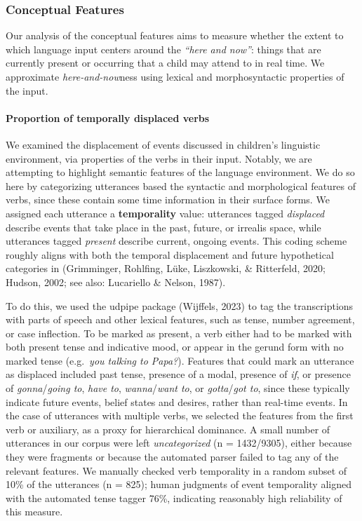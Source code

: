 \documentclass[
  man]{apa6}
\let\oldparagraph\paragraph
\renewcommand{\paragraph}[1]{\oldparagraph{#1}\mbox{}}
\begin{document}
\hypertarget{conceptual-features}{%
\subsubsection{Conceptual Features}\label{conceptual-features}}

Our analysis of the conceptual features aims to measure whether the extent to which language input centers around the \emph{``here and now''}: things that are currently present or occurring that a child may attend to in real time. We approximate \emph{here-and-now}ness using lexical and morphosyntactic properties of the input.

\hypertarget{proportion-of-temporally-displaced-verbs}{%
\paragraph{Proportion of temporally displaced verbs}\label{proportion-of-temporally-displaced-verbs}}

We examined the displacement of events discussed in children's linguistic environment, via properties of the verbs in their input. Notably, we are attempting to highlight semantic features of the language environment. We do so here by categorizing utterances based the syntactic and morphological features of verbs, since these contain some time information in their surface forms. We assigned each utterance a \textbf{temporality} value: utterances tagged \emph{displaced} describe events that take place in the past, future, or irrealis space, while utterances tagged \emph{present} describe current, ongoing events. This coding scheme roughly aligns with both the temporal displacement and future hypothetical categories in (Grimminger, Rohlfing, Lüke, Liszkowski, \& Ritterfeld, 2020; Hudson, 2002; see also: Lucariello \& Nelson, 1987).

To do this, we used the udpipe package (Wijffels, 2023) to tag the transcriptions with parts of speech and other lexical features, such as tense, number agreement, or case inflection. To be marked as present, a verb either had to be marked with both present tense and indicative mood, or appear in the gerund form with no marked tense (e.g.~\emph{you talking to Papa?}). Features that could mark an utterance as displaced included past tense, presence of a modal, presence of \emph{if}, or presence of \emph{gonna}/\emph{going to}, \emph{have to}, \emph{wanna}/\emph{want to}, or \emph{gotta}/\emph{got to}, since these typically indicate future events, belief states and desires, rather than real-time events. In the case of utterances with multiple verbs, we selected the features from the first verb or auxiliary, as a proxy for hierarchical dominance. A small number of utterances in our corpus were left \emph{uncategorized} (n = 1432/9305), either because they were fragments or because the automated parser failed to tag any of the relevant features. We manually checked verb temporality in a random subset of 10\% of the utterances (n = 825); human judgments of event temporality aligned with the automated tense tagger 76\%, indicating reasonably high reliability of this measure.
\end{document}
